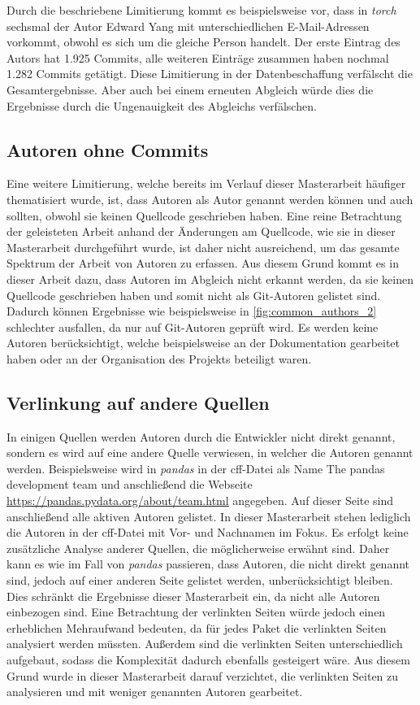 Durch die beschriebene Limitierung kommt es beispielsweise vor, dass in \emph{torch} sechsmal der Autor \glqq Edward Yang\grqq{} mit unterschiedlichen E-Mail-Adressen vorkommt, obwohl es sich um die gleiche Person handelt.
Der erste Eintrag des Autors hat 1.925 Commits, alle weiteren Einträge zusammen haben nochmal 1.282 Commits getätigt.
Diese Limitierung in der Datenbeschaffung verfälscht die Gesamtergebnisse.
Aber auch bei einem erneuten Abgleich würde dies die Ergebnisse durch die Ungenauigkeit des Abgleichs verfälschen.

\subsection*{Autoren ohne Commits}
\label{subsec:autoren_ohne_commits}
Eine weitere Limitierung, welche bereits im Verlauf dieser Masterarbeit häufiger thematisiert wurde, ist, dass Autoren als Autor genannt werden können und auch sollten, obwohl sie keinen Quellcode geschrieben haben.
Eine reine Betrachtung der geleisteten Arbeit anhand der Änderungen am Quellcode, wie sie in dieser Masterarbeit durchgeführt wurde, ist daher nicht ausreichend, um das gesamte Spektrum der Arbeit von Autoren zu erfassen.
Aus diesem Grund kommt es in dieser Arbeit dazu, dass Autoren im Abgleich nicht erkannt werden, da sie keinen Quellcode geschrieben haben und somit nicht als Git-Autoren gelistet sind.
Dadurch können Ergebnisse wie beispielsweise in \autoref{fig:common_authors_2} schlechter ausfallen, da nur auf Git-Autoren geprüft wird.
Es werden keine Autoren berücksichtigt, welche beispielsweise an der Dokumentation gearbeitet haben oder an der Organisation des Projekts beteiligt waren.

\subsection*{Verlinkung auf andere Quellen}
\label{subsec:verlinkung_auf_andere_quellen}
In einigen Quellen werden Autoren durch die Entwickler nicht direkt genannt, sondern es wird auf eine andere Quelle verwiesen, in welcher die Autoren genannt werden.
Beispielsweise wird in \emph{pandas} in der \gls{cff}-Datei als Name \glqq The pandas development team\grqq{} und anschließend die Webseite \url{https://pandas.pydata.org/about/team.html} angegeben.
Auf dieser Seite sind anschließend alle aktiven Autoren gelistet.
In dieser Masterarbeit stehen lediglich die Autoren in der \gls{cff}-Datei mit Vor- und Nachnamen im Fokus.
Es erfolgt keine zusätzliche Analyse anderer Quellen, die möglicherweise erwähnt sind.
Daher kann es wie im Fall von \emph{pandas} passieren, dass Autoren, die nicht direkt genannt sind, jedoch auf einer anderen Seite gelistet werden, unberücksichtigt bleiben.
Dies schränkt die Ergebnisse dieser Masterarbeit ein, da nicht alle Autoren einbezogen sind.
Eine Betrachtung der verlinkten Seiten würde jedoch einen erheblichen Mehraufwand bedeuten, da für jedes Paket die verlinkten Seiten analysiert werden müssten.
Außerdem sind die verlinkten Seiten unterschiedlich aufgebaut, sodass die Komplexität dadurch ebenfalls gesteigert wäre.
Aus diesem Grund wurde in dieser Masterarbeit darauf verzichtet, die verlinkten Seiten zu analysieren und mit weniger genannten Autoren gearbeitet.

